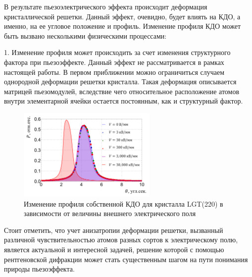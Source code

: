 В результате пьезоэлектрического эффекта происходит деформация
кристаллической решетки. Данный эффект, очевидно, будет влиять на
КДО, а именно, на ее угловое положение и профиль.
Изменение профиля КДО может быть вызвано несколькими физическими процессами:

1. Изменение профиля может происходить за счет изменения структурного фактора при
пьезоэффекте. Данный эффект не рассматривается в рамках настоящей работы.
В первом приближении можно ограничиться случаем однородной деформации решетки
 кристалла. Такая деформация описывается
 матрицей пьезомодулей, вследствие чего относительное расположение атомов
 внутри элементарной ячейки остается постоянным, как и структурный фактор.

 \begin{figure}[H]
   \centering
   \includegraphics[width=0.6\textwidth]{images/self_kdo_under_ex_field.png}
   \caption{Изменение профиля собственной КДО для кристалла LGT(220)
   в зависимости от величины внешнего электрического поля}
   \label{ris:self_kdo_deformation}
 \end{figure}

Стоит отметить, что учет анизатропии деформации решетки, вызванный различной чувствительностью
атомов разных сортов к электрическому полю, является актуальной и интересной задачей,
решение которой с помощью рентгеновской дифракции может стать существенным шагом
на пути понимания природы пьезоэффекта.

